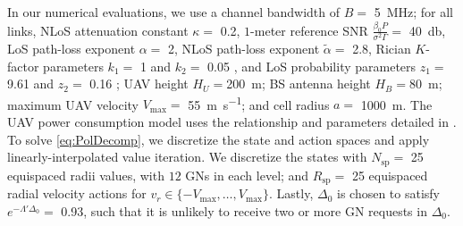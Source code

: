\documentclass[12pt, draftcls, onecolumn]{IEEEtran}
\theoremstyle{plain}
\theoremstyle{definition}
\theoremstyle{remark}
\begin{document}
In our numerical evaluations, we use a channel bandwidth of $B=$ \qty[mode=text]{5}{\mega\hertz}; for all links, NLoS attenuation constant $\kappa=$ \qty[mode=text]{0.2}{}, $1$-meter reference SNR $\frac{\beta_{0}P}{\sigma^{2}\Gamma}=$ \qty[mode=text]{40}{\decibel}, LoS path-loss exponent $\alpha=$ \qty[mode=text]{2}{}, NLoS path-loss exponent $\tilde{\alpha}=$ \qty[mode=text]{2.8}{}, Rician $K$-factor parameters $k_{1}=$ \qty[mode=text]{1}{} and $k_{2}=$ \qty[mode=text]{0.05}{} \cite{Rician}, and LoS probability parameters $z_{1}=$ \qty[mode=text]{9.61}{} and $z_{2}=$ \qty[mode=text]{0.16}{} \cite{OptimalAltitude}; UAV height $H_{U}=$\qty[mode=text]{200}{\meter}; BS antenna height $H_{B}=$\qty[mode=text]{80}{\meter}; maximum UAV velocity $V_{\mathrm{max}}=$ \qty[mode=text]{55}{\meter\per\second}; and cell radius $a=$ \qty[mode=text]{1000}{\meter}. The UAV power consumption model uses the relationship and parameters detailed in \cite{SCA}. To solve \eqref{eq:PolDecomp}, we discretize the state and action spaces and apply linearly-interpolated value iteration. We discretize the states with $N_{\mathrm{sp}}=$ \qty[mode=text]{25}{} equispaced radii values, with $12$ GNs in each level; and $R_{\mathrm{sp}}=$ \qty[mode=text]{25}{} equispaced radial velocity actions for $v_r{\in}\{-V_{\mathrm{max}},{\dots},V_{\mathrm{max}}\}$. Lastly, $\Delta_{0}$ is chosen to satisfy $e^{-\Lambda'\Delta_{0}}{=}$ \qty[mode=text]{0.93}{}, such that it is unlikely to receive two or more GN requests in $\Delta_{0}$.
\end{document}
